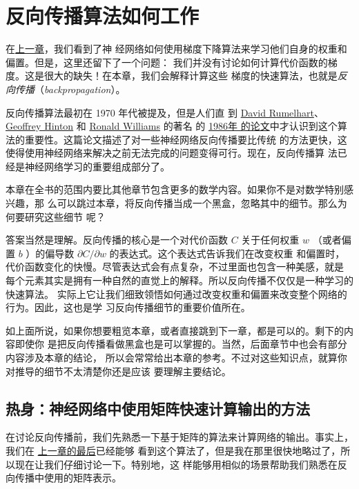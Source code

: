 
\chapter{反向传播算法如何工作}
\label{ch:HowTheBackpropagationAlgorithmWorks}

在\hyperref[ch:UsingNeuralNetsToRecognizeHandwrittenDigits]{上一章}，我们看到了神
经网络如何使用梯度下降算法来学习他们自身的权重和偏置。但是，这里还留下了一个问题：
我们并没有讨论如何计算代价函数的梯度。这是很大的缺失！在本章，我们会解释计算这些
梯度的快速算法，也就是\emph{反向传播}（\emph{backpropagation}）。

反向传播算法最初在 1970 年代被提及，但是人们直
到 \href{http://en.wikipedia.org/wiki/David_Rumelhart}{David
  Rumelhart}、 \href{http://www.cs.toronto.edu/~hinton/}{Geoffrey
  Hinton} 和 \href{http://en.wikipedia.org/wiki/Ronald_J._Williams}{Ronald
  Williams} 的著名
的 \href{http://www.nature.com/nature/journal/v323/n6088/pdf/323533a0.pdf}{1986年
  的论文}中才认识到这个算法的重要性。这篇论文描述了对一些神经网络反向传播要比传统
的方法更快，这使得使用神经网络来解决之前无法完成的问题变得可行。现在，反向传播算
法已经是神经网络学习的重要组成部分了。

本章在全书的范围内要比其他章节包含更多的数学内容。如果你不是对数学特别感兴趣，那
么可以跳过本章，将反向传播当成一个黑盒，忽略其中的细节。那么为何要研究这些细节
呢？

答案当然是理解。反向传播的核心是一个对代价函数 $C$ 关于任何权重 $w$ （或者偏
置 $b$ ）的偏导数 $\partial C/\partial w$ 的表达式。这个表达式告诉我们在改变权重
和偏置时，代价函数变化的快慢。尽管表达式会有点复杂，不过里面也包含一种美感，就是
每个元素其实是拥有一种自然的直觉上的解释。所以反向传播不仅仅是一种学习的快速算法。
实际上它让我们细致领悟如何通过改变权重和偏置来改变整个网络的行为。因此，这也是学
习反向传播细节的重要价值所在。

如上面所说，如果你想要粗览本章，或者直接跳到下一章，都是可以的。剩下的内容即使你
是把反向传播看做黑盒也是可以掌握的。当然，后面章节中也会有部分内容涉及本章的结论，
所以会常常给出本章的参考。不过对这些知识点，就算你对推导的细节不太清楚你还是应该
要理解主要结论。

\section{热身：神经网络中使用矩阵快速计算输出的方法}
\label{sec:warm_up}

在讨论反向传播前，我们先熟悉一下基于矩阵的算法来计算网络的输出。事实上，我们在%
\hyperref[sec:implementing_our_network_to_classify_digits]{上一章的最后}已经能够
看到这个算法了，但是我在那里很快地略过了，所以现在让我们仔细讨论一下。特别地，这
样能够用相似的场景帮助我们熟悉在反向传播中使用的矩阵表示。

